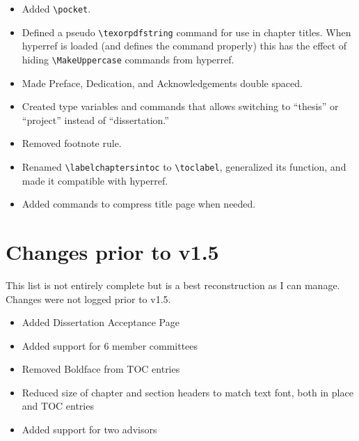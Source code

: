 \begin{itemize}
\item{Added \verb=\pocket=.}
\item{Defined a pseudo \verb=\texorpdfstring= command for use in chapter titles.  When hyperref is loaded (and defines the command properly) this has the effect of hiding \verb=\MakeUppercase= commands from hyperref.}
\item{Made Preface, Dedication, and Acknowledgements double spaced.}
\item{Created type variables and commands that allows switching to ``thesis'' or ``project'' instead of ``dissertation.''}
\item{Removed footnote rule.}
\item{Renamed \verb=\labelchaptersintoc= to \verb=\toclabel=, generalized its function, and made it compatible with hyperref.}
\item{Added commands to compress title page when needed.}
\end{itemize}

\section{Changes prior to v1.5}
This list is not entirely complete but is a best reconstruction as I can manage.  Changes were not logged prior to v1.5.
\begin{itemize}
\item{Added Dissertation Acceptance Page}
\item{Added support for 6 member committees}
\item{Removed Boldface from TOC entries}
\item{Reduced size of chapter and section headers to match text font, both in place and TOC entries}
\item{Added support for two advisors}

\end{itemize}

\endinput